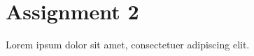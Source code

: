 \documentclass{article}
\begin{document}
\section{Assignment 2}
\label{sec:assignment2}

Lorem ipsum dolor sit amet, consectetuer adipiscing elit.
\end{document}
